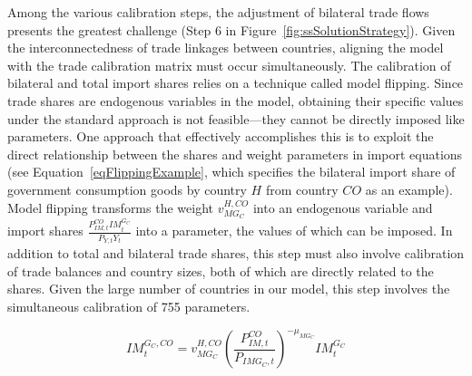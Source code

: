\documentclass[a4paper,11pt]{article}
\numberwithin{equation}{section}
\begin{document}
Among the various calibration steps, the adjustment of bilateral trade flows presents the greatest challenge (Step 6 in Figure~\ref{fig:ssSolutionStrategy}).
Given the interconnectedness of trade linkages between countries, aligning the model with the trade calibration matrix must occur simultaneously.
The calibration of bilateral and total import shares relies on a technique called model flipping.
Since trade shares are endogenous variables in the model, obtaining their specific values under the standard approach is not feasible---they cannot be directly imposed like parameters.
One approach that effectively accomplishes this is to exploit the direct relationship between the shares and weight parameters in import equations (see Equation~\ref{eqFlippingExample}, which specifies the bilateral import share of government consumption goods by country $H$ from country $CO$ as an example).
Model flipping transforms the weight $v_{M G_C}^{H, C O}$ into an endogenous variable and import shares $\frac{P_{IM,t}^{CO}I M_t^{G_C}}{P_{Y,t} Y_t}$ into a parameter, the values of which can be imposed.
In addition to total and bilateral trade shares, this step must also involve calibration of trade balances and country sizes, both of which are directly related to the shares.
Given the large number of countries in our model, this step involves the simultaneous calibration of 755 parameters.

\begin{equation} \label{eqFlippingExample}
I M_t^{G_C, C O}=v_{M G_C}^{H, C O}\left(\frac{P_{I M, t}^{C O}}{P_{I M G_C, t}}\right)^{-\mu_{M G_C}} I M_t^{G_C}\end{equation}

\end{document}
